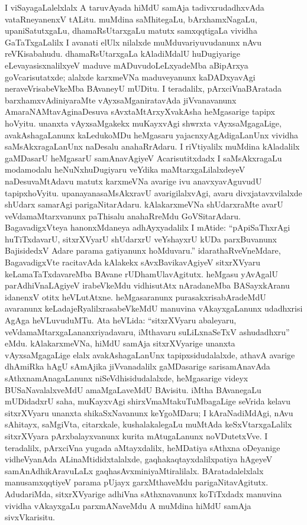 I viSayagaLalelxlalx A taruvAyada hiMdU samAja tadivxrudadhxvAda vataRne\-yanenxV tALitu. muMdina saMhitegaLu, bArxhamxNagaLu, upaniSatutxgaLu, dhamaRsUtarxgaLu matutx samxqqtigaLa vividha GaTaTxgaLalilx I avanati elUlx nilalxde muMduvariyuvudanunx nAvu reVKisabahudu. dhamaRsUtarxgaLa kAladiMdalU huDugiyarige eLevayasisxnalilxyeV maduve mADuvudoLeLxyadeMba aBipArxya goVcarisutatxde; alalxde karxmeVNa maduve\-yanunx kaDADxyavAgi neraveVrisabeVkeMba BAvaneyU mUDitu. I teradalilx, pArxciVna\break BAratada barxhamxvAdiniyaraMte vAyxsaMganiratavAda jiVvanavanunx AmaraNAMtavAgi\break naDesuva sAvxtaMtArxyXvakAsha heMgasarige tapipx hoVyitu. unanxta vAyxsaMgakekx muKayx\-vAgi shwrxta vAyxsaMgagaLige, avakAshagaLanunx kaLedukoMDu heMgasaru yajacnxyAgAdi\-gaLanUnx vividha saMsAkxragaLanUnx naDesalu anahaRrAdaru. I riVtiyalilx \hbox{muMdina} kAladalilx gaMDasarU heMgasarU samAnavAgiyeV Acarisutitxdadx I saMsAkxragaLu modamodalu heNuNxhuDugiyaru veYdika maMtarxgaLilalxdeyeV naDesuvaMtAdavu matutx karxmeVNa avarige ivu anavxyavAguvudU tapipxhoVyitu. upanayanasaMsAkxravU avarigilalxvAgi, avaru divxjatavxvilalxde shUdarx samarAgi parigaNitarAdaru. kAlakarxmeVNa shUdarxraMte avarU veVdamaMtarxvanunx paThisalu anahaRreMdu GoVSitarAdaru. BagavadigxVteya hanonxMda\-neya adhAyxyadalilx I mAtide: ``pApiSaThxrAgi huTiTxdavarU, sitxrXVyarU shUdarxrU veYshayxrU kUDa parxBuvanunx BajisidedxV Adare parama gatiyanunx hoMduvaru.'' idarathaR\-veVneMdare, BagavadigxVte racitavAda kAlakekx sAvxBavikavAgiyeV sitxrXVyaru keLamaTaTxdava\-reMba BAvane rUDhamUlavAgitutx. heMgasu yAvAgalU parAdhiVnaLAgiyeV ira\-beVkeMdu vidhisutAtx nAradaneMba BASayxkAranu idanenxV otitx heVLutAtxne. heMgasaranunx purasakxrisabAradeMdU avaranunx keLadajeRyalilxrasabeVkeMdU manuvina vAkayxgaLanunx udadhxrisi AgAga heVLuvuduMTu. Ata heVLida: ``sitxrXVyaru abaleyaru, veVdamaMtarx\-gaLananxriyadavaru, iMthavaru suLiLxnaSeTxV ashudadhxru'' eMdu. kAlakarxmeVNa, hiMdU samAja sitxrXVyarige unanxta vAyxsaMgagaLige elalx avakAshagaLanUnx tapipxsidudalalxde, athavA avarige dhAmiRka hAgU sAmAjika jiVvanadalilx gaMDasarige sarisamAnavAda sAthxna\break\-mAnagaLanunx niSeVdhisidudalalxde, heMgasarige videyx BUSaNavalalxveMdU amaMgaLa\break\-veMdU BAvisitu. iMtha BAvanegaLu mUDidadxrU saha, muKayxvAgi shirxVmaMta\break kuTuMbagaLige seVrida kelavu sitxrXVyaru unanxta shikaSxNavanunx keYgoMDaru; I kAraNa\-diMdAgi, nAvu sAhitayx, saMgiVta, citarxkale, kushalakalegaLu muMtAda keSxVtarxgaLalilx sitxrXVyara pArxbalayxvanunx kurita mAtugaLanunx noVDutetxVve. I teradalilx, pArxciVna yugada aMtayx\break\-dalilx, heMDatiya sAthxna oDeyanige vidheVyanAda ALinaMtididxtalalxde, gaqhakaqtayxdalilx\break patiya hAgeyeV samAnAdhikAravuLaLx gaqhasAvxminiyaMtiralilalx. BAratadalelxlalx manu\-samxqqtiyeV parama pUjayx garxMthaveMdu parigaNitavAgitutx. AdudariMda, sitxrXVyarige adhiVna sAthxnavanunx koTiTxdadx manuvina vividha vAkayxgaLu parxmANaveMdu A muMdina hiMdU samAja sivxVkarisitu.

